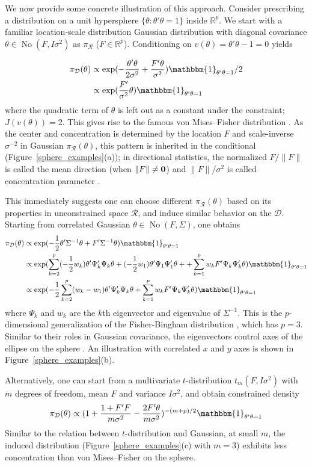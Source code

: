 \documentclass[10pt]{article}
\newcommand{\be}{\begin{equation}\begin{aligned}}
\newcommand{\ee}{\end{aligned}\end{equation}}
\newcommand{\bb}[1]{\mathbb{#1}}
\newcommand{\mc}[1]{\mathcal{#1}}
\DeclareMathOperator{\No}{No}
\DeclareMathOperator{\1}{\mathbbm{1}}
\begin{document}
We now provide some concrete illustration of this approach. Consider prescribing
a distribution on a unit hypersphere $\{\theta:
\theta'\theta=1\}$ inside $\bb R^p$. We start with a familiar
location-scale distribution Gaussian distribution with diagonal
covariance $\theta \in \No(F,I\sigma^2)$ as $\pi_{\mc
R}$ ($F\in \bb R^p$). Conditioning on $v(\theta)=\theta'\theta-1=0$ yields

\be
\pi_{\mc D}(\theta) &\propto
\exp(-\frac{\theta'\theta}{2\sigma^2}+\frac{F'\theta}{\sigma^2})
\mathbbm{1}_{\theta'\theta=1}/2 \\
& \propto
\exp(\frac{F'}{\sigma^2}\theta)
\mathbbm{1}_{\theta'\theta=1}
\ee
where the quadratic term of $\theta$ is left out as a constant under
the constraint; $J(v(\theta))=2$. This gives rise to the famous von
Mises--Fisher distribution \citep{khatri1977mises}. As the center and
concentration is determined by the location $F$ and scale-inverse
$\sigma^{-2}$ in Gaussian $\pi_{\mc
R}(\theta)$, this pattern is inherited in the conditional
(Figure~\ref{sphere_examples}(a)); in directional statistics, the
normalized ${F}/{\|F\|}$ is called the mean
direction (when $\|F\|\neq \bf 0$) and $\|F\|/\sigma^2$ is called
concentration parameter \citep{khatri1977mises}.

This immediately suggests one can choose different $\pi_{\mc R}(\theta)$
based on its properties in unconstrained space $\mc R$, and induce similar behavior on the $\mc D$. Starting from
correlated Gaussian $\theta \in \No(F,\Sigma)$, one obtains 
\be
\pi_{\mc
D}(\theta) & \propto\exp(-\frac{1}{2}\theta'\Sigma^{-1}\theta+
{F'}{\Sigma^{-1}}\theta) \mathbbm{1}_{\theta'\theta=1} \\
& \propto \exp(\sum_{k=2}^p(-\frac{1}{2}w_k)\theta'\Psi_k'\Psi_k\theta
+ (-\frac{1}{2}w_1)\theta' \Psi_1\Psi'_1\theta+
+ \sum_{k=1}^p w_k F'\Psi_k\Psi'_k\theta ) \mathbbm{1}_{\theta'\theta=1} \\
& \propto \exp(-\frac{1}{2}\sum_{k=2}^p( w_k - w_1)\theta'\Psi_k'\Psi_k\theta
+ \sum_{k=1}^p w_k F'\Psi_k\Psi'_k\theta )\mathbbm{1}_{\theta'\theta=1}
\ee
where $\Psi_k$ and $w_k$ are the $k$th eigenvector and eigenvalue of $\Sigma^{-1}$. This is the $p$-dimensional generalization of the Fisher-Bingham distribution
\citep{mardia1975statistics}, which has $p=3$. Similar to their roles in Gaussian covariance,
the eigenvectors control axes of the ellipse on the sphere
\citep{kent1982fisher}. An illustration with correlated $x$ and $y$ axes is shown in
Figure~\ref{sphere_examples}(b).

Alternatively, one can start from a
multivariate $t$-distribution $t_m(F,I\sigma^2)$ with $m$ degrees of freedom,
mean $F$ and variance $I\sigma^2$, and obtain constrained density 
\be
\pi_{\mc
D}(\theta)\propto
(1+\frac{1+F'F}{m\sigma^2}-\frac{2F'\theta}{m\sigma^2})^{-{(m+p)}/{2}}\mathbbm{1}_{\theta'\theta=1}
\ee
Similar to the relation between $t$-distribution and Gaussian, at small
$m$, the induced distribution (Figure~\ref{sphere_examples}(c) with $m=3$) exhibits less concentration than von
Mises--Fisher on the sphere.
\end{document}
